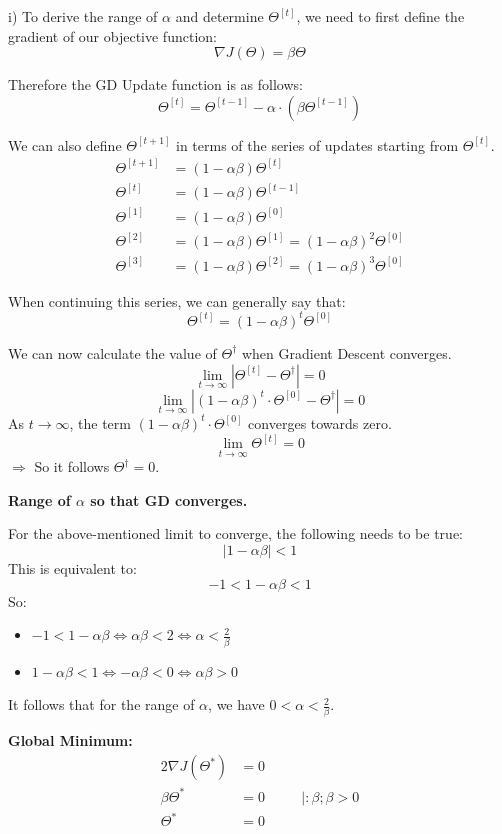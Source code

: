\begin{answer}
    
i) To derive the range of $\alpha$ and determine $\Theta^{[t]}$, we need to first define the gradient of our objective function:
\[
\nabla J(\Theta) = \beta\Theta
\]

Therefore the GD Update function is as follows:
\[
\Theta^{[t]} = \Theta^{[t-1]} - \alpha \cdot (\beta\Theta^{[t-1]})
\]
    

    We can also define \(\Theta^{[t+1]}\) in terms of the series of updates starting from \(\Theta^{[t]}\).
\begin{align*}
\Theta^{[t+1]} &= (1-\alpha\beta) \Theta^{[t]} \\
\Theta^{[t]} &= (1-\alpha\beta) \Theta^{[t-1]} \\
\Theta^{[1]} &= (1-\alpha\beta)\Theta^{[0]} \\
\Theta^{[2]} &= (1-\alpha\beta)\Theta^{[1]} = (1-\alpha\beta)^2 \Theta^{[0]} \\
\Theta^{[3]} &= (1-\alpha\beta)\Theta^{[2]} = (1-\alpha\beta)^3 \Theta^{[0]}
\end{align*}

When continuing this series, we can generally say that:
\[
\Theta^{[t]} = (1-\alpha\beta)^t \Theta^{[0]}
\]

We can now calculate the value of \(\Theta^\dagger\) when Gradient Descent converges.
\[
\lim_{t \to \infty} |\Theta^{[t]} - \Theta^\dagger| = 0
\]
\[
\lim_{t \to \infty} |(1-\alpha\beta)^t \cdot \Theta^{[0]} - \Theta^\dagger| = 0
\]
As \(t \to \infty\), the term \((1-\alpha\beta)^t \cdot \Theta^{[0]}\) converges towards zero.
\[
\lim_{t \to \infty} \Theta^{[t]} = 0
\]
\(\Rightarrow\) So it follows \(\Theta^\dagger = 0\).

\vspace{1em}
\textbf{Range of \(\alpha\) so that GD converges.}

For the above-mentioned limit to converge, the following needs to be true:
\[
|1-\alpha\beta| < 1
\]
This is equivalent to:
\[
-1 < 1-\alpha\beta < 1
\]
So:
\begin{itemize}
    \item[i)] \(-1 < 1-\alpha\beta \iff \alpha\beta < 2 \iff \alpha < \frac{2}{\beta}\)
    \item[ii)] \(1-\alpha\beta < 1 \iff -\alpha\beta < 0 \iff \alpha\beta > 0\)
\end{itemize}
It follows that for the range of $\alpha$, we have \(0 < \alpha < \frac{2}{\beta}\).

\vspace{1em}
\textbf{Global Minimum:}
\begin{alignat*}{2}
    \nabla J(\Theta^*) &= 0 \\
    \beta\Theta^*&=0 \hspace{1em} &&\left| : \beta; \beta > 0  \right. \\
    \Theta^* &= 0
  \end{alignat*}


\end{answer}
